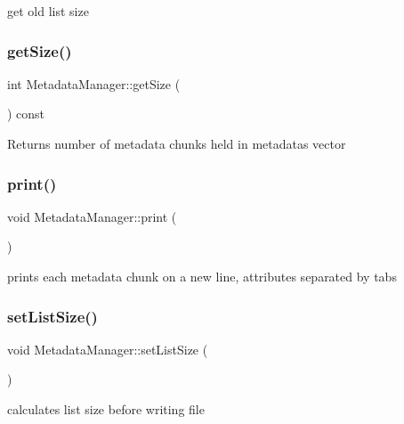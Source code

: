 get old list size \mbox{\label{classMetadataManager_a497d7031313fd7c43b11228145e927c2}} 
\subsubsection{\texorpdfstring{get\+Size()}{getSize()}}
{\footnotesize\ttfamily int Metadata\+Manager\+::get\+Size (\begin{DoxyParamCaption}{ }\end{DoxyParamCaption}) const}

\begin{DoxyReturn}{Returns}
number of metadata chunks held in metadatas vector 
\end{DoxyReturn}
\mbox{\label{classMetadataManager_a4eb5b8e9539b2e158cacdd1bca2cacd9}} 
\subsubsection{\texorpdfstring{print()}{print()}}
{\footnotesize\ttfamily void Metadata\+Manager\+::print (\begin{DoxyParamCaption}{ }\end{DoxyParamCaption})}

prints each metadata chunk on a new line, attributes separated by tabs \mbox{\label{classMetadataManager_a0a5a92ad2a37e118273df2ba15de802c}} 
\subsubsection{\texorpdfstring{set\+List\+Size()}{setListSize()}}
{\footnotesize\ttfamily void Metadata\+Manager\+::set\+List\+Size (\begin{DoxyParamCaption}{ }\end{DoxyParamCaption})}

calculates list size before writing file \mbox{\label{classMetadataManager_ab67fbd206d6baa6e8c7e623564ca5f29}} 
